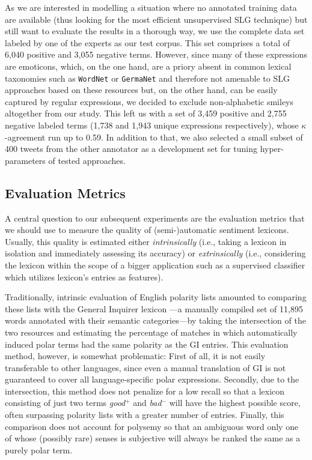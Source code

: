 As we are interested in modelling a situation where no annotated
training data are available (thus looking for the most efficient
unsupervised SLG technique) but still want to evaluate the results in
a thorough way, we use the complete data set labeled by one of the
experts as our test corpus.  This set comprises a total of 6,040
positive and 3,055 negative terms.  However, since many of these
expressions are emoticons, which, on the one hand, are a priory absent
in common lexical taxonomies such as \texttt{WordNet}
\cite{Miller:95,Miller:07} or \texttt{GermaNet} \cite{Hamp:97} and
therefore not amenable to SLG approaches based on these resources but,
on the other hand, can be easily captured by regular expressions, we
decided to exclude non-alphabetic smileys altogether from our study.
This left us with a set of 3,459 positive and 2,755 negative labeled
terms (1,738 and 1,943 unique expressions respectively), whose
$\kappa$-agreement run up to 0.59.  In addition to that, we also
selected a small subset of 400 tweets from the other annotator as a
development set for tuning hyper-parameters of tested approaches.

\subsection{Evaluation Metrics}\label{subsec:snt-lex:eval-metrics}

A central question to our subsequent experiments are the evaluation
metrics that we should use to measure the quality of (semi-)automatic
sentiment lexicons.  Usually, this quality is estimated either
\textit{intrinsically} (i.e., taking a lexicon in isolation and
immediately assessing its accuracy) or \textit{extrinsically} (i.e.,
considering the lexicon within the scope of a bigger application such
as a supervised classifier which utilizes lexicon's entries as
features).

Traditionally, intrinsic evaluation of English polarity lists amounted
to comparing these lists with the General Inquirer lexicon \cite[GI;
][]{Stone:66}---a manually compiled set of 11,895 words annotated with
their semantic categories---by taking the intersection of the two
resources and estimating the percentage of matches in which
automatically induced polar terms had the same polarity as the GI
entries.  This evaluation method, however, is somewhat problematic:
First of all, it is not easily transferable to other languages, since
even a manual translation of GI is not guaranteed to cover all
language-specific polar expressions.  Secondly, due to the
intersection, this method does not penalize for a low recall so that a
lexicon consisting of just two terms \textit{good}$^+$ and
\textit{bad}$^-$ will have the highest possible score, often
surpassing polarity lists with a greater number of entries.  Finally,
this comparison does not account for polysemy so that an ambiguous
word only one of whose (possibly rare) senses is subjective will
always be ranked the same as a purely polar term.

